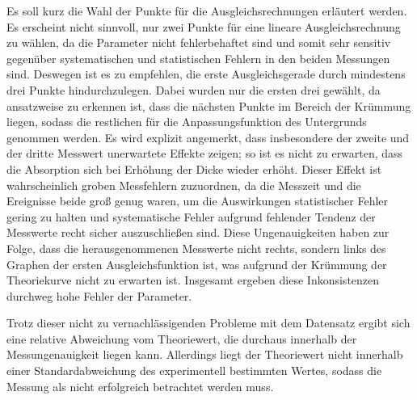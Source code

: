 Es soll kurz die Wahl der Punkte für die
Ausgleichsrechnungen erläutert werden. Es erscheint nicht sinnvoll, nur zwei Punkte für eine lineare Ausgleichsrechnung
zu wählen, da die Parameter nicht fehlerbehaftet sind und somit sehr sensitiv gegenüber systematischen und
statistischen Fehlern in den beiden Messungen sind. Deswegen ist es zu empfehlen, die erste Ausgleichsgerade
durch mindestens drei Punkte hindurchzulegen. Dabei wurden nur die ersten drei gewählt, da ansatzweise
zu erkennen ist, dass die nächsten Punkte im Bereich der Krümmung liegen, sodass die restlichen für
die Anpassungsfunktion des Untergrunds genommen werden. Es wird explizit angemerkt, dass insbesondere
der zweite und der dritte Messwert unerwartete Effekte zeigen; so ist es nicht zu erwarten, dass
die Absorption sich bei Erhöhung der Dicke wieder erhöht. Dieser Effekt ist wahrscheinlich groben
Messfehlern zuzuordnen, da die Messzeit und die Ereignisse beide groß genug waren, um die Auswirkungen
statistischer Fehler gering zu halten und systematische Fehler aufgrund fehlender Tendenz der Messwerte
recht sicher auszuschließen sind. Diese Ungenauigkeiten haben zur Folge, dass die herausgenommenen Messwerte
nicht rechts, sondern links des Graphen der ersten Ausgleichsfunktion ist, was aufgrund der Krümmung
der Theoriekurve nicht zu erwarten ist. Insgesamt ergeben diese Inkonsistenzen durchweg hohe
Fehler der Parameter.

Trotz dieser nicht zu vernachlässigenden Probleme mit dem Datensatz
ergibt sich eine relative Abweichung vom Theoriewert, die durchaus innerhalb der Messungenauigkeit liegen kann. Allerdings
liegt der Theoriewert nicht innerhalb einer Standardabweichung des experimentell bestimmten
Wertes, sodass die Messung als nicht erfolgreich betrachtet werden muss.
